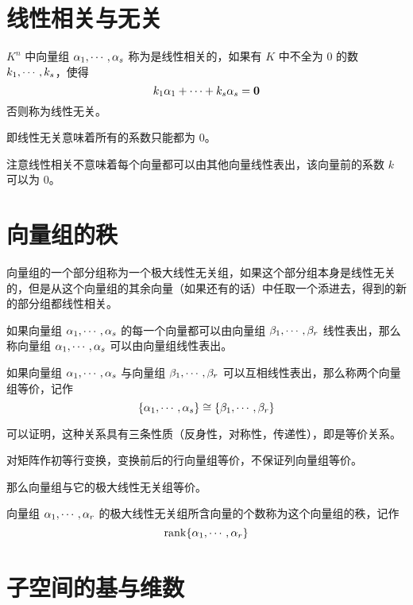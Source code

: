\section{线性相关与无关}

\begin{definition}
	$K^n$ 中向量组 $\alpha_1,\cdots,\alpha_s$ 称为是线性相关的，如果有 $K$ 中不全为 $0$ 的数 $k_1,\cdots,k_s$，使得
	\[k_1\alpha_1+\cdots+k_s\alpha_s=\boldsymbol{0}\]
	否则称为线性无关。
\end{definition}

即线性无关意味着所有的系数只能都为 $0$。

注意线性相关不意味着每个向量都可以由其他向量线性表出，该向量前的系数 $k$ 可以为 $0$。

\section{向量组的秩}

\begin{definition}[极大线性无关组]
	向量组的一个部分组称为一个极大线性无关组，如果这个部分组本身是线性无关的，但是从这个向量组的其余向量（如果还有的话）中任取一个添进去，得到的新的部分组都线性相关。
\end{definition}

如果向量组 $\alpha_1,\cdots,\alpha_s$ 的每一个向量都可以由向量组 $\beta_1,\cdots,\beta_r$ 线性表出，那么称向量组 $\alpha_1,\cdots,\alpha_s$ 可以由向量组线性表出。

\begin{definition}
	如果向量组 $\alpha_1,\cdots,\alpha_s$ 与向量组 $\beta_1,\cdots,\beta_r$ 可以互相线性表出，那么称两个向量组等价，记作
	\[\{\alpha_1,\cdots,\alpha_s\} \cong \{\beta_1,\cdots,\beta_r\}\]
\end{definition}

可以证明，这种关系具有三条性质（反身性，对称性，传递性），即是等价关系。

对矩阵作初等行变换，变换前后的行向量组等价，不保证列向量组等价。

那么向量组与它的极大线性无关组等价。

\begin{definition}
	向量组 $\alpha_1,\cdots,\alpha_r$ 的极大线性无关组所含向量的个数称为这个向量组的秩，记作
	\[\operatorname{rank}\{\alpha_1,\cdots,\alpha_r\}\]
\end{definition}

\section{子空间的基与维数}

